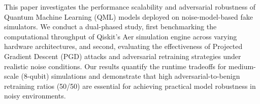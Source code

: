 This paper investigates the performance scalability and adversarial robustness of Quantum Machine Learning (QML) models deployed on noise-model-based fake simulators. We conduct a dual-phased study, first benchmarking the computational throughput of Qiskit's Aer simulation engine across varying hardware architectures, and second, evaluating the effectiveness of Projected Gradient Descent (PGD) attacks and adversarial retraining strategies under realistic noise conditions. Our results quantify the runtime tradeoffs for medium-scale (8-qubit) simulations and demonstrate that high adversarial-to-benign retraining ratios (50/50) are essential for achieving practical model robustness in noisy environments.
